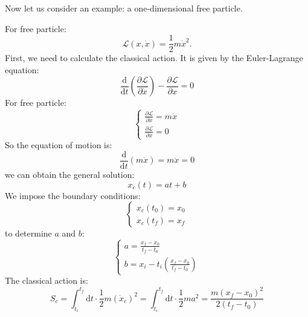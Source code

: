 Now let us consider an example: a one-dimensional free particle.
\begin{example}
    For free particle:
    \begin{equation}
    \mathcal{L}(x, \dot{x}) = \frac{1}{2}m\dot{x}^2.
    \end{equation}
    First, we need to calculate the classical action. It is given by the Euler-Lagrange equation:
    \begin{equation}
    \frac{\mathrm{d}}{\mathrm{d}t}\left(\frac{\partial\mathcal{L}}{\partial\dot{x}}\right) - \frac{\partial\mathcal{L}}{\partial x} = 0
    \end{equation}
    For free particle:
    \begin{equation}
    \begin{cases}
    \frac{\partial\mathcal{L}}{\partial\dot{x}} = m\dot{x} \\
    \frac{\partial\mathcal{L}}{\partial x} = 0
    \end{cases}
    \end{equation}
    So the equation of motion is:
    \begin{equation}
    \frac{\mathrm{d}}{\mathrm{d}t}(m\dot{x}) = m\ddot{x} = 0
    \end{equation}
    we can obtain the general solution:
    \begin{equation}
    x_c(t) = at + b
    \end{equation}
    We impose the boundary conditions:
    \begin{equation}
    \begin{cases}
    x_c(t_0) = x_0 \\
    x_c(t_f) = x_f
    \end{cases}
    \end{equation}
    to determine $a$ and $b$:
    \begin{equation}
    \begin{cases}
    a = \frac{x_f - x_0}{t_f - t_0} \\
    b = x_i - t_i \left(\frac{x_f - x_0}{t_f - t_0}\right)
    \end{cases}
    \end{equation}
    The classical action is:
    \begin{equation}
    S_c = \int_{t_i}^{t_f} \mathrm{d}t \cdot \frac{1}{2}m(\dot{x}_c)^2 = \int_{t_i}^{t_f} \mathrm{d}t \cdot \frac{1}{2}ma^2 = \frac{m(x_f - x_0)^2}{2(t_f - t_0)}
    \end{equation}


\end{example}
